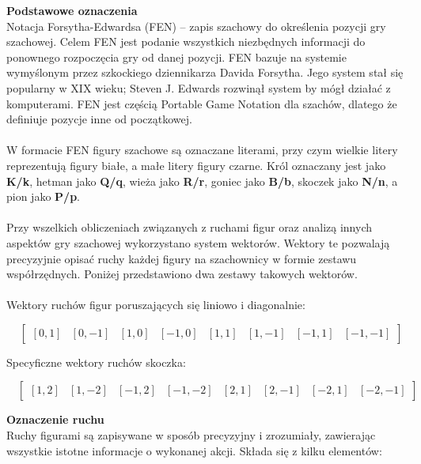 \documentclass[12pt,a4paper]{article}
\begin{document}
\noindent \textbf{Podstawowe oznaczenia}\\
Notacja Forsytha-Edwardsa (FEN) – zapis szachowy do określenia pozycji gry szachowej. Celem FEN jest podanie wszystkich niezbędnych informacji do ponownego rozpoczęcia gry od danej pozycji. FEN bazuje na systemie wymyślonym przez szkockiego dziennikarza Davida Forsytha. Jego system stał się popularny w XIX wieku; Steven J. Edwards rozwinął system by mógł działać z komputerami. FEN jest częścią Portable Game Notation dla szachów, dlatego że definiuje pozycje inne od początkowej.
\\\\
W formacie FEN figury szachowe są oznaczane literami, przy czym wielkie litery reprezentują figury białe, a małe litery figury czarne. Król oznaczany jest jako \textbf{K/k}, hetman jako \textbf{Q/q}, wieża jako \textbf{R/r}, goniec jako \textbf{B/b}, skoczek jako \textbf{N/n}, a pion jako \textbf{P/p}.
\\\\
Przy wszelkich obliczeniach związanych z ruchami figur oraz analizą innych aspektów gry szachowej wykorzystano system wektorów. Wektory te pozwalają precyzyjnie opisać ruchy każdej figury na szachownicy w formie zestawu współrzędnych. Poniżej przedstawiono dwa zestawy takowych wektorów.
\\\\
Wektory ruchów figur poruszających się liniowo i diagonalnie:

\[ \quad 
\begin{bmatrix}
    [0, 1] & [0, -1] & [1, 0] & [-1, 0] & [1, 1] & [1, -1] & [-1, 1] & [-1, -1]
\end{bmatrix}
\]

\noindent
Specyficzne wektory ruchów skoczka:

\[ \quad 
\begin{bmatrix}
    [1, 2] & [1, -2] & [-1, 2] & [-1, -2] & [2, 1] & [2, -1] & [-2, 1] & [-2, -1]
\end{bmatrix}
\]

\vspace{0.5cm}

\noindent \textbf{Oznaczenie ruchu}\\
Ruchy figurami są zapisywane w sposób precyzyjny i zrozumiały, zawierając wszystkie istotne informacje o wykonanej akcji. Składa się z kilku elementów:
\end{document}
